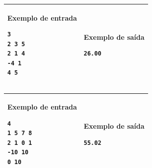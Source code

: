 \begin{table}[!h]
\centering
\begin{tabular}{|l|l|}
\hline
\begin{minipage}[t]{3in}
\textbf{Exemplo de entrada}
\begin{verbatim}
3
2 3 5
2 1 4
-4 1
4 5
\end{verbatim}
\vspace{1mm}
\end{minipage}
&
\begin{minipage}[t]{3in}
\textbf{Exemplo de saída}
\begin{verbatim}
26.00
\end{verbatim}
\vspace{1mm}
\end{minipage} \\
\hline
\end{tabular}
\end{table}

\begin{table}[!h]
\centering
\begin{tabular}{|l|l|}
\hline
\begin{minipage}[t]{3in}
\textbf{Exemplo de entrada}
\begin{verbatim}
4
1 5 7 8
2 1 0 1
-10 10
0 10
\end{verbatim}
\vspace{1mm}
\end{minipage}
&
\begin{minipage}[t]{3in}
\textbf{Exemplo de saída}
\begin{verbatim}
55.02
\end{verbatim}
\vspace{1mm}
\end{minipage} \\
\hline
\end{tabular}
\end{table}
